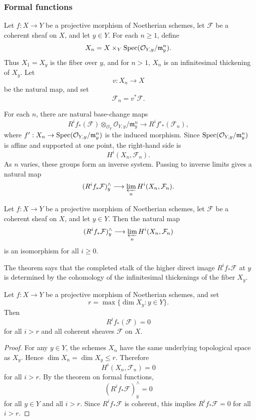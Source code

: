 \documentclass[12pt]{article}
\begin{document}
\subsubsection{Formal functions}
Let $f:X\to Y$ be a projective morphism of Noetherian schemes, let $\mathcal F$ be a coherent sheaf on $X$, and let $y\in Y$. For each $n\geq 1$, define
\[
    X_n=X\times_Y \operatorname{Spec}(\mathcal O_{Y,y}/\mathfrak m_y^n).
\]
Thus $X_1=X_y$ is the fiber over $y$, and for $n>1$, $X_n$ is an infinitesimal thickening of $X_y$. Let
\[
    v:X_n\to X
\]
be the natural map, and set
\[
    \mathcal F_n=v^*\mathcal F.
\]

For each $n$, there are natural base-change maps
\[
    R^if_*(\mathcal F)\otimes_{\mathcal O_Y}\mathcal O_{Y,y}/\mathfrak m_y^n
    \longrightarrow
    R^if'_{*}(\mathcal F_n),
\]
where $f':X_n\to \operatorname{Spec}(\mathcal O_{Y,y}/\mathfrak m_y^n)$ is the induced morphism. Since $\operatorname{Spec}(\mathcal O_{Y,y}/\mathfrak m_y^n)$ is affine and supported at one point, the right-hand side is
\[
    H^i(X_n,\mathcal F_n).
\]
As $n$ varies, these groups form an inverse system. Passing to inverse limits gives a natural map
\[
    (R^if_*\mathcal F)^\wedge_y
    \longrightarrow
    \varprojlim_n H^i(X_n,\mathcal F_n).
\]

\begin{theorem}
    Let $f:X\to Y$ be a projective morphism of Noetherian schemes, let $\mathcal F$ be a coherent sheaf on $X$, and let $y\in Y$. Then the natural map
    \[
        (R^if_*\mathcal F)^\wedge_y
        \longrightarrow
        \varprojlim_n H^i(X_n,\mathcal F_n)
    \]
    is an isomorphism for all $i\geq 0$.
\end{theorem}

\begin{remark}
    The theorem says that the completed stalk of the higher direct image $R^if_*\mathcal F$ at $y$ is determined by the cohomology of the infinitesimal thickenings of the fiber $X_y$.
\end{remark}

\begin{corollary}
    Let $f:X\to Y$ be a projective morphism of Noetherian schemes, and set
    \[
        r=\max\{\dim X_y:y\in Y\}.
    \]
    Then
    \[
        R^if_*(\mathcal F)=0
    \]
    for all $i>r$ and all coherent sheaves $\mathcal F$ on $X$.
\end{corollary}

\begin{proof}
    For any $y\in Y$, the schemes $X_n$ have the same underlying topological space as $X_y$. Hence $\dim X_n=\dim X_y\leq r$. Therefore
    \[
        H^i(X_n,\mathcal F_n)=0
    \]
    for all $i>r$. By the theorem on formal functions,
    \[
        (R^if_*\mathcal F)^\wedge_y=0
    \]
    for all $y\in Y$ and all $i>r$. Since $R^if_*\mathcal F$ is coherent, this implies $R^if_*\mathcal F=0$
    for all $i>r$.
\end{proof}
\end{document}
